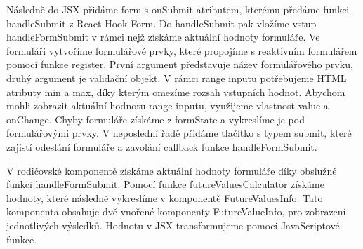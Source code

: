 Následně do JSX přidáme form s onSubmit atributem, kterému předáme funkci handleSubmit z React Hook Form. Do handleSubmit pak vložíme vstup handleFormSubmit v rámci nejž získáme aktuální hodnoty formuláře. 
Ve formuláři vytvoříme formulářové prvky, které propojíme s reaktivním formulářem pomocí funkce register. První argument představuje název formulářového prvku, druhý argument je validační objekt. 
V rámci range inputu potřebujeme HTML atributy min a max, díky kterým omezíme rozsah vstupních hodnot. Abychom mohli zobrazit aktuální hodnotu range inputu, využijeme vlastnost value a onChange. 
Chyby formuláře získáme z formState a vykreslíme je pod formulářovými prvky. V neposlední řadě přidáme tlačítko s typem submit, které zajistí odeslání formuláře a zavolání callback funkce handleFormSubmit.

V rodičovské komponentě získáme aktuální hodnoty formuláře díky obslužné funkci handleFormSubmit. Pomocí funkce futureValuesCalculator získáme hodnoty, které následně vykreslíme v komponentě FutureValuesInfo. 
Tato komponenta obsahuje dvě vnořené komponenty FutureValueInfo, pro zobrazení jednotlivých výsledků. Hodnotu v JSX transformujeme pomocí JavaScriptové funkce.





